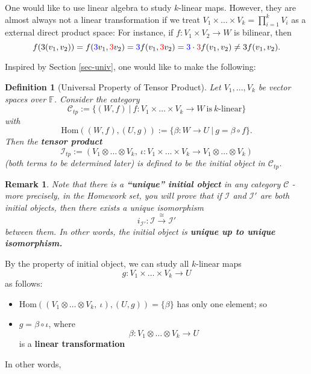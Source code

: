 \documentclass[12pt]{amsbook}
\newtheorem{definition}[theorem]{Definition}
\newtheorem{remark}[theorem]{Remark}
\begin{document}
One would like to use linear algebra to study $k$-linear maps. However, they are almost always not a linear transformation if we treat $V_1 \times \dots \times V_k = \prod_{i = 1}^k V_i$ as a external direct product space:
For instance, if $f : V_1 \times V_2 \to W$ is bilinear, then 
$$f(3(v_1,v_2)) = f({\color{blue} 3}v_1, {\color{red} 3}v_2) = {\color{blue} 3}f(v_1, {\color{red} 3}v_2) = {\color{blue} 3}\cdot {\color{red} 3}f(v_1,v_2) \neq 3f(v_1,v_2).$$

Inspired by Section \ref{sec-univ}, one would like to make the following:
\begin{definition}[Universal Property of Tensor Product] 
Let $V_1, \dots, V_k$ be vector spaces over $\mathbb{F}$. Consider the category
$$\mathcal{C}_{tp} := \{(W,f)\ |\ f: V_1 \times \dots \times V_k \to W\ \text{is}\ k\text{-linear}\}$$
with
$$\mathrm{Hom}((W,f),(U,g)) := \{\beta : W \to U\ |\ g = \beta \circ f\}.$$
Then the {\bf tensor product}
$$\mathcal{I}_{tp} := (V_1 \otimes \dots \otimes V_k,\ \iota: V_1 \times \dots \times V_k \to V_1 \otimes \dots \otimes V_k)$$
(both terms to be determined later) is defined to be the initial object in $\mathcal{C}_{tp}$.
\end{definition}

\begin{remark}
    Note that there is a {\bf ``unique'' initial object} in any category $\mathcal{C}$ - more precisely, in the Homework set, you will prove that
    if $\mathcal{I}$ and $\mathcal{I}'$ are both initial objects, then there exists a unique isomorphism
    $$i_{\mathcal{I}'}: \mathcal{I} \xrightarrow{\cong} \mathcal{I}'$$
    between them. In other words, the initial object is {\bf unique up to unique isomorphism.}
 \end{remark}

By the property of initial object, we can study all $k$-linear maps
$$g: V_1 \times \dots \times V_k \to U$$
as follows:
\begin{itemize}
    \item $\mathrm{Hom}((V_1 \otimes \dots \otimes V_k,\ \iota), (U,g)) = \{\beta\}$ has only one element; so
    \item $g = \beta \circ \iota$, where 
    $$\beta: V_1 \otimes \dots \otimes V_k \to U$$ 
    is a {\bf linear transformation}
\end{itemize}
In other words,
\begin{center}
\end{center}
\end{document}
